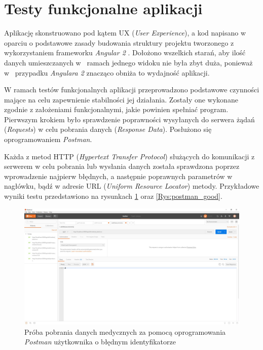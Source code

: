 \section{Testy funkcjonalne aplikacji}

Aplikację skonstruowano pod kątem UX (\textit{User Experience}), a kod napisano w~ oparciu o podstawowe zasady budowania struktury projektu tworzonego z wykorzystaniem frameworku \textit{Angular 2} \cite{Ans}. Dołożono wszelkich starań, aby ilość danych umieszczanych w~ ramach jednego widoku nie była zbyt duża, ponieważ w~ przypadku \textit{Angulara 2} znacząco obniża to wydajność aplikacji. 

W ramach testów funkcjonalnych aplikacji przeprowadzono podstawowe czynności mające na celu zapewnienie stabilności jej działania. Zostały one wykonane zgodnie z założeniami funkcjonalnymi, jakie powinien spełniać program. Pierwszym krokiem było sprawdzenie poprawności wysyłanych do serwera żądań (\textit{Requests}) w celu pobrania danych (\textit{Response Data}). Posłużono się oprogramowaniem \textit{Postman}. 

Każda z metod HTTP (\textit{Hypertext Transfer Protocol}) służących do komunikacji z serwerem w celu pobrania lub wysłania danych została sprawdzona poprzez wprowadzenie najpierw błędnych, a następnie poprawnych parametrów w nagłówku, bądź w adresie URL (\textit{Uniform Resource Locator}) metody. Przykładowe wyniki testu przedstawiono na rysunkach \ref{Rys:postman_fail} oraz \ref{Rys:postman_good}.

\begin{figure}[h]
	\centering\includegraphics[scale=0.3]{images/postman.JPG}
	\caption{Próba pobrania danych medycznych za pomocą oprogramowania \textit{Postman} użytkownika o błędnym identyfikatorze}
	\label{Rys:postman_fail}
\end{figure}

